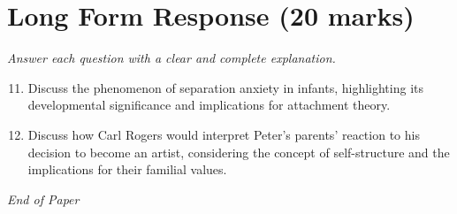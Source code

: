 \documentclass[12pt]{article}
\begin{document}
\section*{Long Form Response (20 marks)}
\textit{Answer each question with a clear and complete explanation.}
\begin{enumerate}[label=\arabic*.]
\setcounter{enumi}{10}
\item Discuss the phenomenon of separation anxiety in infants, highlighting its developmental significance and implications for attachment theory.
\item Discuss how Carl Rogers would interpret Peter's parents' reaction to his decision to become an artist, considering the concept of self-structure and the implications for their familial values.
\end{enumerate}

\vfill
\noindent\textit{End of Paper}
\end{document}
